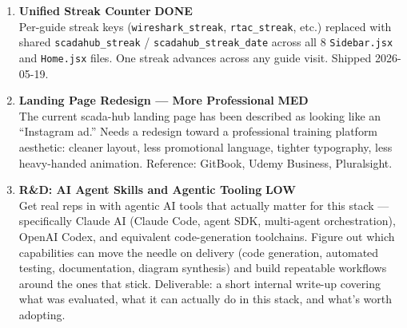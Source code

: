 \documentclass[10pt]{article}
\newcommand{\med}{\textcolor{samber}{\small\bfseries MED}}
\newcommand{\low}{\textcolor{sgreen}{\small\bfseries LOW}}
\newcommand{\done}{\textcolor{sgreen}{\small\bfseries DONE}}
\begin{document}
\begin{enumerate}[resume]
  \item \textbf{Unified Streak Counter} \hfill \done \\
    Per-guide streak keys (\texttt{wireshark\_streak}, \texttt{rtac\_streak}, etc.) replaced with shared \texttt{scadahub\_streak} / \texttt{scadahub\_streak\_date} across all 8 \texttt{Sidebar.jsx} and \texttt{Home.jsx} files. One streak advances across any guide visit. Shipped 2026-05-19.

  \item \textbf{Landing Page Redesign --- More Professional} \hfill \med \\
    The current scada-hub landing page has been described as looking like an ``Instagram ad.'' Needs a redesign toward a professional training platform aesthetic: cleaner layout, less promotional language, tighter typography, less heavy-handed animation. Reference: GitBook, Udemy Business, Pluralsight.

  \item \textbf{R\&D: AI Agent Skills and Agentic Tooling} \hfill \low \\
    Get real reps in with agentic AI tools that actually matter for this stack — specifically Claude AI (Claude Code, agent SDK, multi-agent orchestration), OpenAI Codex, and equivalent code-generation toolchains. Figure out which capabilities can move the needle on delivery (code generation, automated testing, documentation, diagram synthesis) and build repeatable workflows around the ones that stick. Deliverable: a short internal write-up covering what was evaluated, what it can actually do in this stack, and what's worth adopting.
\end{enumerate}
\end{document}
